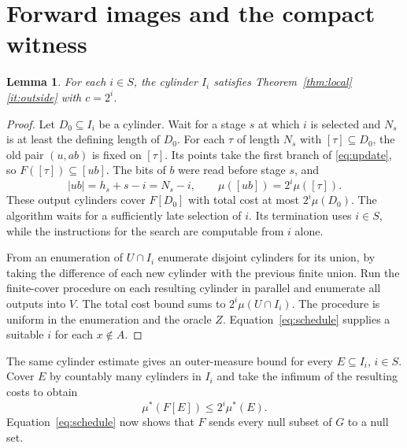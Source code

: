 \documentclass[12pt,reqno]{amsart}
\newtheorem{lemma}[theorem]{Lemma}
\newcommand{\mass}{\mu}
\begin{document}
\section{Forward images and the compact witness}\label{sec:image}

\begin{lemma}\label{lem:covers}
For each $i\in S$, the cylinder $I_i$ satisfies
Theorem~\ref{thm:local}\,\eqref{it:outside} with $c=2^i$.
\end{lemma}
\begin{proof}
Let $D_0\subseteq I_i$ be a cylinder. Wait for a stage $s$ at which $i$
is selected and $N_s$ is at least the defining length of $D_0$. For each
$\tau$ of length $N_s$ with $[\tau]\subseteq D_0$, the old pair $(u,ab)$
is fixed on $[\tau]$. Its points take the first branch of \eqref{eq:update},
so $F([\tau])\subseteq[ub]$. The bits of $b$ were read before stage $s$,
and
\[
       |ub|=h_s+s-i=N_s-i,\qquad \mass([ub])=2^i\mass([\tau]).
\]
These output cylinders cover $F[D_0]$ with total cost at most
$2^i\mass(D_0)$. The algorithm waits for a sufficiently late
selection of $i$. Its termination uses $i\in S$, while the instructions
for the search are computable from $i$ alone.

From an enumeration of $U\cap I_i$ enumerate disjoint cylinders for its
union, by taking the difference of each new cylinder with the previous
finite union. Run the finite-cover procedure on each resulting cylinder
in parallel and enumerate all outputs into $V$. The total cost bound
sums to $2^i\mass(U\cap I_i)$. The procedure is uniform in the enumeration
and the oracle $Z$. Equation~\eqref{eq:schedule} supplies a suitable $i$
for each $x\notin A$.
\end{proof}

The same cylinder estimate gives an outer-measure bound for every
$E\subseteq I_i$, $i\in S$. Cover $E$ by countably many cylinders in
$I_i$ and take the infimum of the resulting costs to obtain
\[
                \mass^*(F[E])\le 2^i\mass^*(E).
\]
Equation~\eqref{eq:schedule} now shows that $F$ sends every null subset
of $G$ to a null set.
\end{document}
